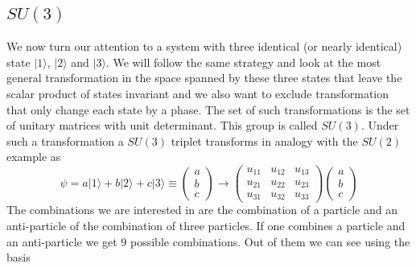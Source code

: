 \documentclass[12pt]{article}
\begin{document}
\subsection{$SU(3)$}
We now turn our attention to a system with three identical (or nearly identical) state $|1\rangle$, $|2\rangle$ and $|3\rangle$. We will follow the same strategy and look at the most general transformation in the space spanned by these three states that leave the scalar product of states invariant and we also want to exclude transformation that only change each state by a phase. The set of such transformations is the set of unitary matrices with unit determinant. This group is called $SU(3)$. Under such a transformation a $SU(3)$ triplet transforms in analogy with the $SU(2)$ example as
\[\psi=a|1\rangle+b|2\rangle+c|3\rangle\equiv\left(\begin{array}{c}a\\b\\c\end{array}\right)\rightarrow\left(\begin{array}{ccc}u_{11}&u_{12}&u_{13}\\u_{21}&u_{22}&u_{23}\\u_{31}&u_{32}&u_{33}\end{array}\right)\left(\begin{array}{c}a\\b\\c\end{array}\right)\]
    The combinations we are interested in are the combination of a particle and an anti-particle of the combination of three particles. If one combines a particle and an anti-particle we get $9$ possible combinations. Out of them we can see using the basis
\end{document}
